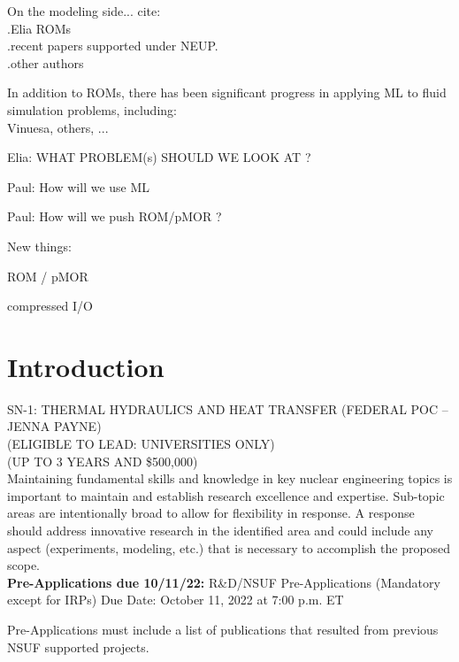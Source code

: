 On the modeling side...  cite: \\
.Elia ROMs \\
.recent papers supported under NEUP. \\
.other authors
 
In addition to ROMs, there has been significant progress in applying 
ML to fluid simulation problems, including: \\
Vinuesa, others, ...


Elia: WHAT PROBLEM(s) SHOULD WE LOOK AT ?

Paul: How will we use ML

Paul: How will we push ROM/pMOR ?









New things:

ROM / pMOR

compressed I/O 

















\section{Introduction}

SN-1: THERMAL HYDRAULICS AND HEAT TRANSFER (FEDERAL POC – JENNA PAYNE) \\
(ELIGIBLE TO LEAD: UNIVERSITIES ONLY) \\
(UP TO 3 YEARS AND \$500,000) \\

Maintaining fundamental skills and knowledge in key nuclear engineering topics
is important to maintain and establish research excellence and expertise.
Sub-topic areas are intentionally broad to allow for flexibility in response. A
response should address innovative research in the identified area and could
include any aspect (experiments, modeling, etc.) that is necessary to
accomplish the proposed scope.
\\

{\bf Pre-Applications due 10/11/22:}
R\&D/NSUF Pre-Applications (Mandatory except for IRPs) Due Date: October 11, 2022 at 7:00 p.m. ET


Pre-Applications must include a list of publications
that resulted from previous NSUF supported projects.


